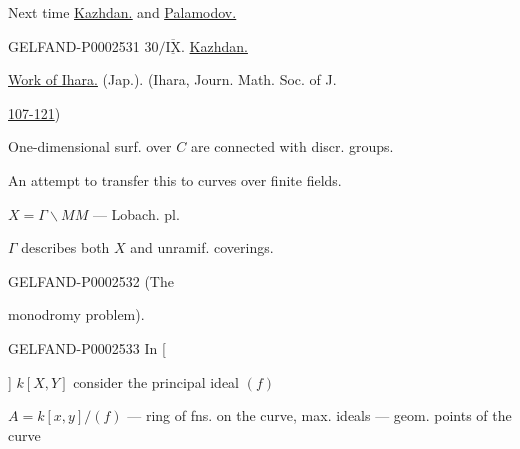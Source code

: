 Next time \underline{\underline{Kazhdan.}} and \underline{\underline{Palamodov.}}







\begin{GelfandAdjacentEvidence}{GELFAND-P000253}{1}
$30/\underline{\overline{\mathrm{IX}}}$. \underline{Kazhdan.}





\underline{Work of Ihara.} (Jap.). (Ihara, Journ. Math. Soc. of J.




\underline{107-121})
\end{GelfandAdjacentEvidence}





One-dimensional surf. over $C$ are connected with discr. groups.

An attempt to transfer this to curves over finite fields.





$X=\Gamma\backslash M$\qquad $M$ — Lobach. pl.

$\Gamma$ describes both $X$ and unramif. coverings.





\begin{GelfandAdjacentEvidence}{GELFAND-P000253}{2}
(The 

 monodromy problem).
\end{GelfandAdjacentEvidence}

\begin{GelfandAdjacentEvidence}{GELFAND-P000253}{3}
In [

] $k[X, Y]$ consider the principal ideal $(f)$
\end{GelfandAdjacentEvidence}

$A=k[x, y]/(f)$ — ring of fns. on the curve, max. ideals — geom. points of the curve





